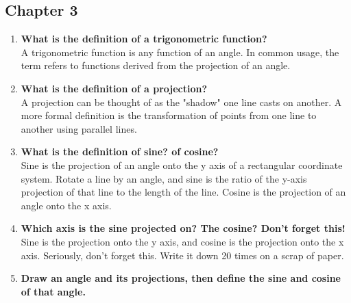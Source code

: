 \clearpage
\subsection{Chapter 3}

\begin{enumerate}

\item{{\bf What is the definition of a trigonometric function?}\\
{A trigonometric function is any function of an angle.  In common usage, the term refers to functions derived from the projection of an angle.}}

\item{{\bf What is the definition of a projection?}\\
{A projection can be thought of as the "shadow" one line casts on another.  A more formal definition is the transformation of points from one line to another using parallel lines.}}

\item{{\bf What is the definition of sine?  of cosine?}\\
{Sine is the projection of an angle onto the y axis of a rectangular coordinate system.  Rotate a line by an angle, and sine is the ratio of the y-axis projection of that line to the length of the line.  Cosine is the projection of an angle onto the x axis.}}

\item{{\bf Which axis is the sine projected on?  The cosine?  Don't forget this!}\\
{Sine is the projection onto the y axis, and cosine is the projection onto the x axis.  Seriously, don't forget this.  Write it down 20 times on a scrap of paper.}}

\item{{\bf Draw an angle and its projections, then define the sine and cosine of that angle.}\\
{}}

\begin{figure}[htb!]
\center
\label{fig:projection_onto_axes}
\end{figure}
\end{enumerate}
